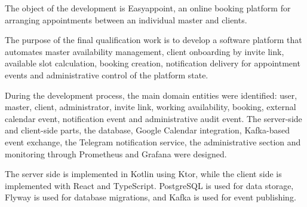 The object of the development is Easyappoint, an online booking platform for arranging appointments between an individual master and clients.

The purpose of the final qualification work is to develop a software platform that automates master availability management, client onboarding by invite link, available slot calculation, booking creation, notification delivery for appointment events and administrative control of the platform state.

During the development process, the main domain entities were identified: user, master, client, administrator, invite link, working availability, booking, external calendar event, notification event and administrative audit event. The server-side and client-side parts, the database, Google Calendar integration, Kafka-based event exchange, the Telegram notification service, the administrative section and monitoring through Prometheus and Grafana were designed.

The server side is implemented in Kotlin using Ktor, while the client side is implemented with React and TypeScript. PostgreSQL is used for data storage, Flyway is used for database migrations, and Kafka is used for event publishing.

